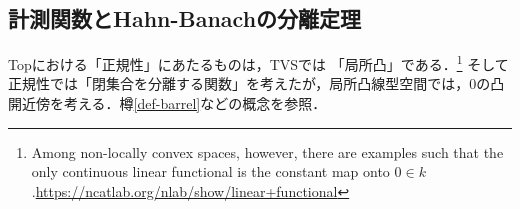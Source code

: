 \documentclass[uplatex,dvipdfmx]{jsreport}
\begin{document}
\subsection{計測関数とHahn-Banachの分離定理}\label{sub-Hahn-Banach-separation}

\begin{tcolorbox}[colframe=ForestGreen, colback=ForestGreen!10!white,breakable,colbacktitle=ForestGreen!40!white,coltitle=black,fonttitle=\bfseries\sffamily,
title=]
    Topにおける「正規性」にあたるものは，TVSでは
    「局所凸」である．\footnote{Among non-locally convex spaces, however, there are examples such that the only continuous linear functional is the constant map onto $0 \in k$.\url{https://ncatlab.org/nlab/show/linear+functional}}
    そして正規性では「閉集合を分離する関数」を考えたが，局所凸線型空間では，$0$の凸開近傍を考える．樽\ref{def-barrel}などの概念を参照．
\end{tcolorbox}
\end{document}
